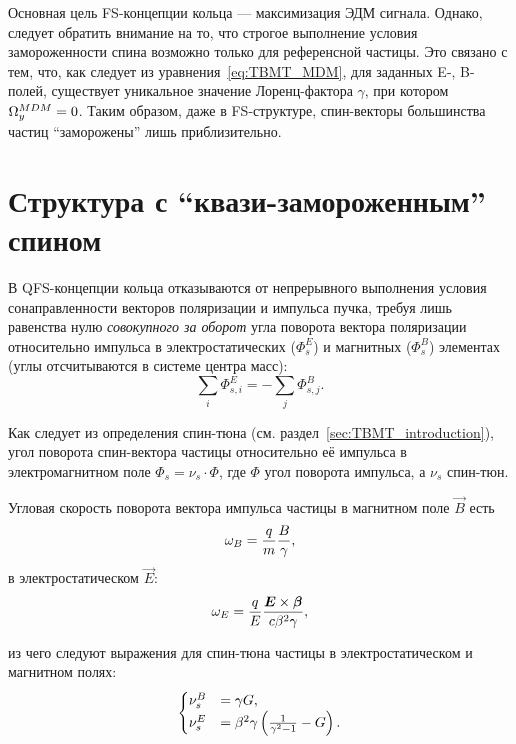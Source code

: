 Основная цель FS-концепции кольца --- максимизация ЭДМ сигнала. Однако, следует обратить внимание на то, что строгое выполнение условия замороженности спина возможно только для референсной частицы. Это связано с тем, что, как следует из уравнения~\eqref{eq:TBMT_MDM}, для заданных E-, B-полей, существует уникальное значение Лоренц-фактора $\gamma$, при котором $\Omega_y^{MDM} = 0$. Таким образом, даже в FS-структуре, спин-векторы большинства частиц ``заморожены'' лишь приблизительно.

\section{Структура с ``квази-замороженным'' спином} \label{chpt2:concept:QFS}
В QFS-концепции кольца отказываются от непрерывного выполнения условия сонаправленности векторов поляризации и импульса пучка, требуя лишь равенства нулю \emph{совокупного за оборот} угла поворота вектора поляризации относительно импульса в электростатических ($\Phi_s^E$) и магнитных ($\Phi_s^B$) элементах (углы отсчитываются в системе центра масс):~\cite{Senichev:Lattices}
\begin{equation*}
	\sum_i \Phi_{s,i}^E = -\sum_j \Phi_{s,j}^B.
\end{equation*}

Как следует из определения спин-тюна (см. раздел~\ref{sec:TBMT_introduction}), угол поворота спин-вектора частицы относительно её импульса в электромагнитном поле $\Phi_s = \nu_s \cdot \Phi$, где $\Phi$ угол поворота импульса, а $\nu_s$ спин-тюн.

Угловая скорость поворота вектора импульса частицы в магнитном поле $\vec B$ есть 
\[
\omega_B = \frac qm \frac B \gamma,
\]
в электростатическом $\vec E$:
\[
\omega_E = \frac qE \frac{\boldsymbol E\times \boldsymbol\beta}{c\beta^2\gamma},
\]

из чего следуют выражения для спин-тюна частицы в электростатическом и магнитном полях:
\begin{equation}
	\begin{cases}
		\nu_s^B &= \gamma G, \\
		\nu_s^E &= \beta^2\gamma\bkt{\frac{1}{\gamma^2-1} - G}.
	\end{cases}
\end{equation}

